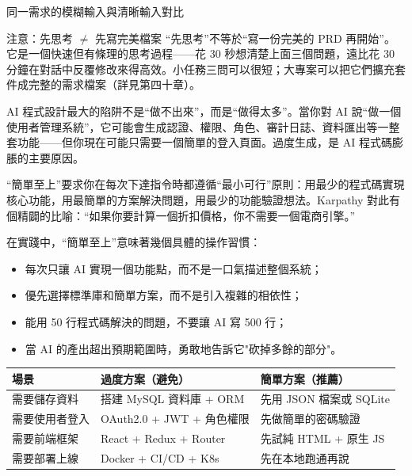 \begin{center}\small\color{gray}同一需求的模糊輸入與清晰輸入對比\end{center}

\begin{tcbwarn}{注意：先思考 $\neq$ 先寫完美檔案}
“先思考”不等於“寫一份完美的 PRD 再開始”。它是一個快速但有條理的思考過程——花 30 秒想清楚上面三個問題，遠比花 30 分鐘在對話中反覆修改來得高效。小任務三問可以很短；大專案可以把它們擴充套件成完整的需求檔案（詳見第四十章）。

\end{tcbwarn}


AI 程式設計最大的陷阱不是“做不出來”，而是“做得太多”。當你對 AI 說“做一個使用者管理系統”，它可能會生成認證、權限、角色、審計日誌、資料匯出等一整套功能——但你現在可能只需要一個簡單的登入頁面。過度生成，是 AI 程式碼膨脹的主要原因。

“簡單至上”要求你在每次下達指令時都遵循“最小可行”原則：用最少的程式碼實現核心功能，用最簡單的方案解決問題，用最少的功能驗證想法。Karpathy 對此有個精闢的比喻：“如果你要計算一個折扣價格，你不需要一個電商引擎。”

在實踐中，“簡單至上”意味著幾個具體的操作習慣：

\begin{itemize}
  \item 每次只讓 AI 實現一個功能點，而不是一口氣描述整個系統；
  \item 優先選擇標準庫和簡單方案，而不是引入複雜的相依性；
  \item 能用 50 行程式碼解決的問題，不要讓 AI 寫 500 行；
  \item 當 AI 的產出超出預期範圍時，勇敢地告訴它"砍掉多餘的部分"。
\end{itemize}

\begin{center}
\begin{tabularx}{\linewidth}{|X|X|X|}
\hline
\textbf{場景} & \textbf{過度方案（避免）} & \textbf{簡單方案（推薦）} \tabularnewline
\hline
需要儲存資料 & 搭建 MySQL 資料庫 + ORM & 先用 JSON 檔案或 SQLite \tabularnewline
需要使用者登入 & OAuth2.0 + JWT + 角色權限 & 先做簡單的密碼驗證 \tabularnewline
需要前端框架 & React + Redux + Router & 先試純 HTML + 原生 JS \tabularnewline
需要部署上線 & Docker + CI/CD + K8s & 先在本地跑通再說 \tabularnewline
\hline
\end{tabularx}
\end{center}

